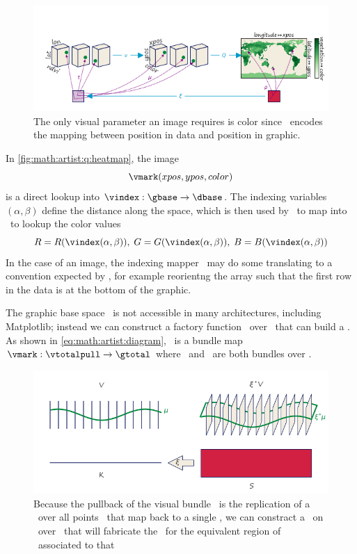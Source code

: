 \documentclass[../main.tex]{subfiles}
\begin{document}
\begin{figure}[H]
    \includegraphics[width=\textwidth]{figures/math/image.png}
    \caption{The only visual parameter an image requires is color since \vindex\ encodes the mapping between position in data and position in graphic. }
    \label{fig:math:artist:q:heatmap}
\end{figure}
In \autoref{fig:math:artist:q:heatmap}, the image 
\begin{equation}
\vmark(xpos, ypos, color)
\label{eq:math:artist:q:image}
\end{equation}
 is a direct lookup into  $\vindex:\gbase\rightarrow\dbase$. The indexing variables $(\alpha, \beta)$ define the distance along the space, which is then used by \vindex\ to map into \dbase\ to lookup the color values 
\begin{equation*}
R = R(\vindex(\alpha, \beta)), \; G = G(\vindex(\alpha, \beta)), \; B = B(\vindex(\alpha, \beta))
\end{equation*}
In the case of an image, the indexing mapper \vindex\ may do some translating to a convention expected by \vmark, for example reorientng the array such that the first row in the data is at the bottom of the graphic. 


\label{sec:math:artist:qhat}
The graphic base space \gbase\ is not accessible in many architectures, including Matplotlib; instead we can construct a factory function \vmarkd\ over \dbase\ that can build a \vmark. As shown in \autoref{eq:math:artist:diagram}, \vmark\ is a bundle map $\vmark: \vtotalpull\rightarrow \gtotal$ where \vtotalpull\ and \gtotal\ are both bundles over \gbase.
\begin{figure}[htb]
  \centering
    \includegraphics[width=1\textwidth]{figures/math/q_hat.png}
    \caption{Because the pullback of the visual bundle \vtotalpull\ is the replication of a \vsection\ over all points \gbasepoint\ that map back to a single \dbasepoint, we can constract a \vmarkd\ on \vsection\ over \dbasepoint\ that will fabricate the \vmark\ for the equivalent region of \gbasepoint\ associated to that \dbasepoint}
    \label{fig:math:artist:qhat}
\end{figure}
\end{document}

